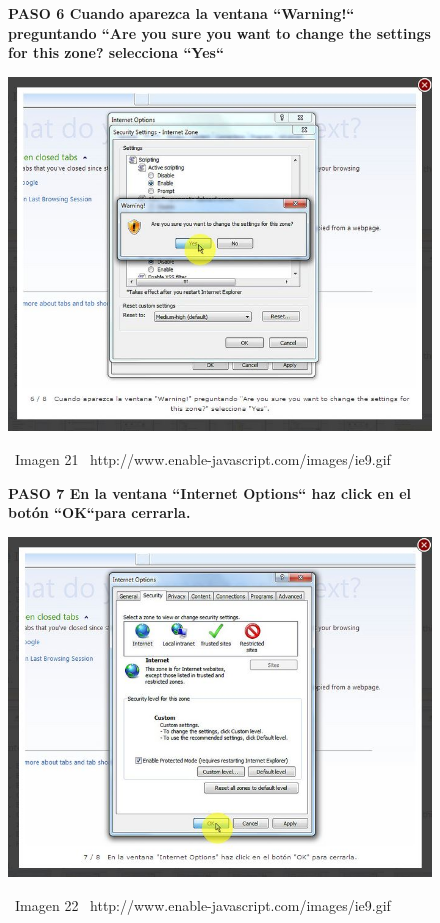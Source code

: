 \documentclass[11pt]{article} %
\begin{document}
\begin{figure}
\begin{center}



\begin{center}
\bf PASO 6
Cuando aparezca la ventana ``Warning!``  preguntando  ``Are you sure you want to change the settings for this zone?  selecciona ``Yes``

\includegraphics[height=8 cm, width=8 cm] {imagenes/explorer 06.jpg}
\end{center}
\ Imagen 21
\ {http://www.enable-javascript.com/images/ie9.gif }

\begin{center}
\bf PASO 7
En la ventana ``Internet Options`` haz click en el botón ``OK``para cerrarla.

\includegraphics[height=8 cm, width=8 cm] {imagenes/explorer 07.jpg}
\end{center}
\ Imagen 22
\ {http://www.enable-javascript.com/images/ie9.gif }

\end{center}
\end{figure}
\end{document}
